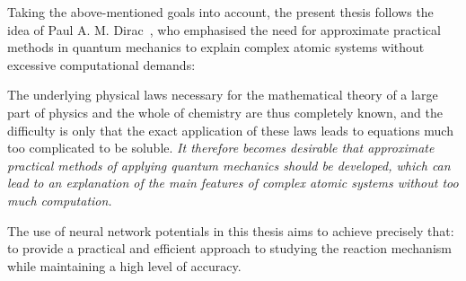 Taking the above-mentioned goals into account, the present thesis follows the idea of Paul A. M. Dirac~\citep{diracQuantumMechanicsManyelectron1997}, who emphasised the need for approximate practical methods in quantum mechanics to explain complex atomic systems without excessive computational demands: 

\begin{displayquote}
    The underlying physical laws necessary for the mathematical theory of a large part of physics and the whole of chemistry are thus completely known, and the difficulty is only that the exact application of these laws leads to equations much too complicated to be soluble. \textit{It therefore becomes desirable that approximate practical methods of applying quantum mechanics should be developed, which can lead to an explanation of the main features of complex atomic systems without too much computation.}
\end{displayquote}

The use of neural network potentials in this thesis aims to achieve precisely that: to provide a practical and efficient approach to studying the reaction mechanism while maintaining a high level of accuracy.
